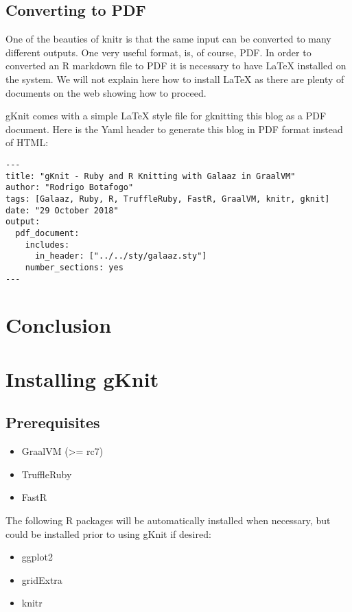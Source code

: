 \documentclass[]{article}
\providecommand{\tightlist}{%
  \setlength{\itemsep}{0pt}\setlength{\parskip}{0pt}}
\begin{document}
\subsection{Converting to PDF}\label{converting-to-pdf}

One of the beauties of knitr is that the same input can be converted to
many different outputs. One very useful format, is, of course, PDF. In
order to converted an R markdown file to PDF it is necessary to have
LaTeX installed on the system. We will not explain here how to install
LaTeX as there are plenty of documents on the web showing how to
proceed.

gKnit comes with a simple LaTeX style file for gknitting this blog as a
PDF document. Here is the Yaml header to generate this blog in PDF
format instead of HTML:

\begin{verbatim}
---
title: "gKnit - Ruby and R Knitting with Galaaz in GraalVM"
author: "Rodrigo Botafogo"
tags: [Galaaz, Ruby, R, TruffleRuby, FastR, GraalVM, knitr, gknit]
date: "29 October 2018"
output:
  pdf_document:
    includes:
      in_header: ["../../sty/galaaz.sty"]
    number_sections: yes
---
\end{verbatim}

\section{Conclusion}\label{conclusion}

\section{Installing gKnit}\label{installing-gknit}

\subsection{Prerequisites}\label{prerequisites}

\begin{itemize}
\tightlist
\item
  GraalVM (\textgreater{}= rc7)
\item
  TruffleRuby
\item
  FastR
\end{itemize}

The following R packages will be automatically installed when necessary,
but could be installed prior to using gKnit if desired:

\begin{itemize}
\tightlist
\item
  ggplot2
\item
  gridExtra
\item
  knitr
\end{itemize}
\end{document}
